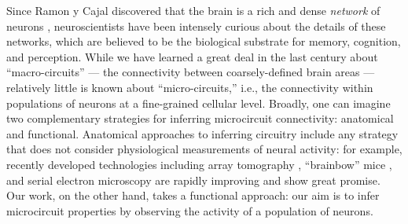 Since Ramon y Cajal discovered that the brain is a rich and dense \emph{network} of neurons \cite{RamonyCajal04,RamonyCajal23}, neuroscientists have been intensely curious about the details of these networks, which are believed to be the biological substrate for memory, cognition, and perception. While we have learned a great deal in the last century about ``macro-circuits'' --- the connectivity between coarsely-defined brain areas --- relatively little is known about ``micro-circuits,'' i.e., the connectivity within populations of neurons at a fine-grained cellular level. Broadly, one can imagine two complementary strategies for inferring microcircuit connectivity: anatomical and functional. Anatomical approaches to inferring circuitry include any strategy that does not consider physiological measurements of neural activity: for example, recently developed technologies including array tomography \cite{MichevaSmith07}, ``brainbow'' mice \cite{Brainbow07}, and serial electron microscopy \cite{Briggman2006} are rapidly improving and show great promise. Our work, on the other hand, takes a functional approach: our aim is to infer microcircuit properties by observing the activity of a population of neurons.


